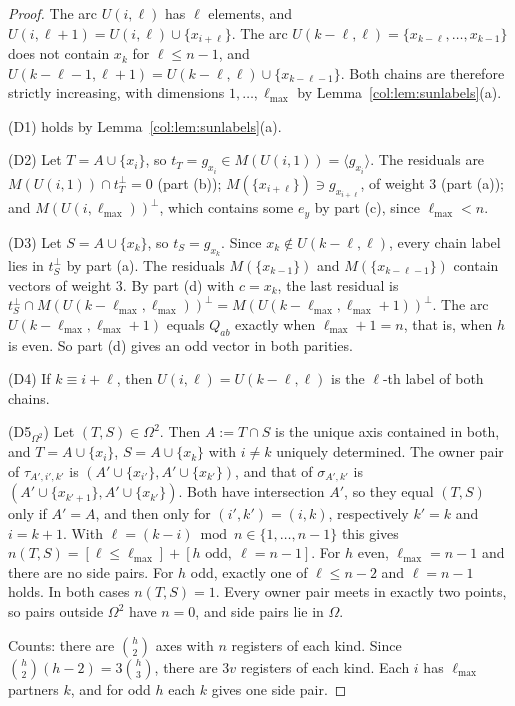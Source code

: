 \begin{proof}
The arc $U(i,\ell)$ has $\ell$ elements, and $U(i,\ell+1)=U(i,\ell)\cup\{x_{i+\ell}\}$. The arc
$U(k-\ell,\ell)=\{x_{k-\ell},\dots,x_{k-1}\}$ does not contain $x_k$ for $\ell\le n-1$, and
$U(k-\ell-1,\ell+1)=U(k-\ell,\ell)\cup\{x_{k-\ell-1}\}$. Both chains are therefore strictly
increasing, with dimensions $1,\dots,\ell_{\max}$ by Lemma~\ref{col:lem:sunlabels}(a).

(D1) holds by Lemma~\ref{col:lem:sunlabels}(a).

(D2) Let $T=A\cup\{x_i\}$, so $t_T=g_{x_i}\in M(U(i,1))=\langle g_{x_i}\rangle$. The residuals are
$M(U(i,1))\cap t_T^\perp=0$ (part (b)); $M(\{x_{i+\ell}\})\ni g_{x_{i+\ell}}$, of weight $3$ (part (a));
and $M(U(i,\ell_{\max}))^\perp$, which contains some $e_y$ by part (c), since $\ell_{\max}<n$.

(D3) Let $S=A\cup\{x_k\}$, so $t_S=g_{x_k}$. Since $x_k\notin U(k-\ell,\ell)$, every chain label lies in
$t_S^\perp$ by part (a). The residuals $M(\{x_{k-1}\})$ and $M(\{x_{k-\ell-1}\})$ contain vectors of
weight $3$. By part (d) with $c=x_k$, the last residual is
$t_S^\perp\cap M(U(k-\ell_{\max},\ell_{\max}))^\perp=M(U(k-\ell_{\max},\ell_{\max}+1))^\perp$. The arc
$U(k-\ell_{\max},\ell_{\max}+1)$ equals $Q_{ab}$ exactly when $\ell_{\max}+1=n$, that is, when $h$ is even.
So part (d) gives an odd vector in both parities.

(D4) If $k\equiv i+\ell$, then $U(i,\ell)=U(k-\ell,\ell)$ is the $\ell$-th label of both chains.

(D5$_{\Omega^2}$) Let $(T,S)\in\Omega^2$. Then $A:=T\cap S$ is the unique axis contained in both, and
$T=A\cup\{x_i\}$, $S=A\cup\{x_k\}$ with $i\ne k$ uniquely determined. The owner pair of
$\tau_{A',i',k'}$ is $(A'\cup\{x_{i'}\},A'\cup\{x_{k'}\})$, and that of $\sigma_{A',k'}$ is
$(A'\cup\{x_{k'+1}\},A'\cup\{x_{k'}\})$. Both have intersection $A'$, so they equal $(T,S)$ only if
$A'=A$, and then only for $(i',k')=(i,k)$, respectively $k'=k$ and $i=k+1$. With
$\ell=(k-i)\bmod n\in\{1,\dots,n-1\}$ this gives $n(T,S)=[\ell\le\ell_{\max}]+[h\text{ odd},\ \ell=n-1]$.
For $h$ even, $\ell_{\max}=n-1$ and there are no side pairs. For $h$ odd, exactly one of $\ell\le n-2$
and $\ell=n-1$ holds. In both cases $n(T,S)=1$. Every owner pair meets in exactly two points, so pairs
outside $\Omega^2$ have $n=0$, and side pairs lie in $\Omega$.

Counts: there are $\binom h2$ axes with $n$ registers of each kind. Since $\binom h2(h-2)=3\binom h3$, there
are $3v$ registers of each kind. Each $i$ has $\ell_{\max}$ partners $k$, and for odd $h$ each $k$ gives one
side pair.
\end{proof}

